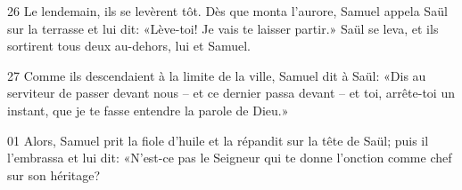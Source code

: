 
26 Le lendemain, ils se levèrent tôt. Dès que monta l’aurore, Samuel appela Saül sur la terrasse et lui dit: «Lève-toi! Je vais te laisser partir.» Saül se leva, et ils sortirent tous deux au-dehors, lui et Samuel.

27 Comme ils descendaient à la limite de la ville, Samuel dit à Saül: «Dis au serviteur de passer devant nous – et ce dernier passa devant – et toi, arrête-toi un instant, que je te fasse entendre la parole de Dieu.»

01 Alors, Samuel prit la fiole d’huile et la répandit sur la tête de Saül; puis il l’embrassa et lui dit: «N’est-ce pas le Seigneur qui te donne l’onction comme chef sur son héritage?

